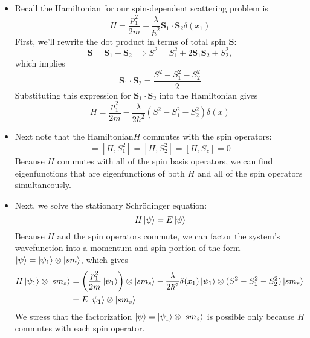 \documentclass[11pt, a4paper]{article}
\newcommand{\Schro}{Schr\"{o}dinger\xspace}
\newcommand{\Ham}{Hamiltonian\xspace}
\renewcommand{\vec}[1]{\bm{#1}} %
\begin{document}
\begin{itemize}
	\item Recall the Hamiltonian for our spin-dependent scattering problem is
	\begin{equation*}
		H = \frac{p_{1}^{2}}{2m} - \frac{\lambda}{\hbar^{2}}\vec{S}_{1} \cdot \vec{S}_{2}\delta (x_{1})
	\end{equation*}
	First, we'll rewrite the dot product in terms of total spin $ \vec{S} $:
	\begin{equation*}
		\vec{S} = \vec{S}_{1} + \vec{S}_{2} \implies S^{2} = S_{1}^{2} + 2\vec{S}_{1}\vec{S}_{2} + S_{2}^{2},
	\end{equation*}
	which implies 
	\begin{equation*}
		\vec{S}_{1}\cdot \vec{S}_{2} = \frac{S^{2} -S_{1}^{2} - S_{2}^{2}}{2}
	\end{equation*}
	Substituting this expression for $ \vec{S}_{1}\cdot \vec{S}_{2} $ into the Hamiltonian gives
	\begin{equation*}
		H = \frac{p_{1}^{2}}{2m} -  \frac{\lambda}{2\hbar^{2}}(S^{2} -S_{1}^{2} - S_{2}^{2})\delta(x)
	\end{equation*}
	
	\item Next note that the \Ham $ H $ commutes with the spin operators:
	\begin{equation*}
		[H, S^{2}] = [H, S_{1}^{2}] = [H, S_{2}^{2}] = [H, S_{z}] = 0
	\end{equation*}
	Because $ H $ commutes with all of the spin basis operators, we can find eigenfunctions that are eigenfunctions of both $ H $ and all of the spin operators simultaneously.
	
	\item Next, we solve the stationary \Schro equation:
	\begin{equation*}
		H \ket{\psi} = E\ket{\psi}
	\end{equation*}
	Because $ H $ and the spin operators commute, we can factor the system's wavefunction into a momentum and spin portion of the form $ \ket{\psi} = \ket{\psi_{1}} \otimes \ket{sm} $, which gives
	\begin{align*}
		H \ket{\psi_{1}} \otimes \ket{sm_{s}} &= \left(\frac{p_{1}^{2}}{2m}\ket{\psi_{1}}\right)\otimes \ket{sm_{s}} - \frac{\lambda}{2\hbar^{2}} \delta (x_{1})\ket{\psi_{1}}\otimes (S^{2} -S_{1}^{2} - S_{2}^{2}) \ket{sm_{s}}\\
		&= E \ket{\psi_{1}}\otimes \ket{sm_{s}}
	\end{align*}
	We stress that the factorization $ \ket{\psi} = \ket{\psi_{1}} \otimes \ket{sm_{s}} $ is possible only because $ H $ commutes with each spin operator.
	

\end{itemize}
\end{document}
